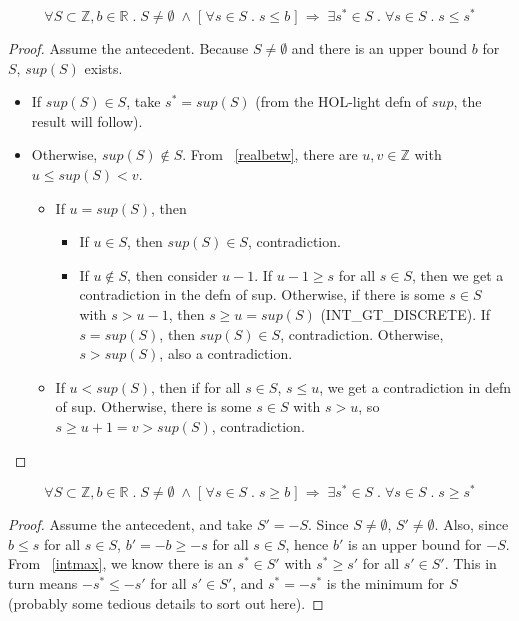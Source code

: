 \documentclass{article}
\begin{document}
\begin{lem}
\label{intmax}
\begin{equation*}
\forall S \subset \mathbb{Z}, b \in \mathbb{R} \; . \;
 S \neq \emptyset \; \wedge \; \big [ \; \forall s \in S \; . \; s \leq b \;
\big ] \; \Longrightarrow \; \exists s^* \in S \; . \; \forall s \in S \; . \;
s \leq s^*
\end{equation*}
\begin{proof} Assume the antecedent. Because $S \neq \emptyset$ and
there is an upper bound $b$ for $S$, $sup(S)$ exists.
\begin{itemize}
\item If $sup(S) \in S$, take $s^* = sup(S)$ (from the HOL-light defn of 
$sup$, the result will follow).
\item Otherwise, $sup(S) \notin S$. From ~\ref{realbetw}, there are
$u, v \in \mathbb{Z}$ with $u \leq sup(S) < v$.
\begin{itemize}
\item If $u = sup(S)$, then
\begin{itemize}
\item If $u \in S$, then $sup(S) \in S$, contradiction.
\item If $u \notin S$, then consider $u - 1$. If $u - 1 \geq s$ for all
$s \in S$, then we get a contradiction in the defn of sup. Otherwise, if
there is some $s \in S$ with $s > u - 1$, then $s \geq u = sup(S)$
(INT\_GT\_DISCRETE). If $s = sup(S)$, then $sup(S) \in S$, contradiction.
Otherwise, $s > sup(S)$, also a contradiction.
\end{itemize}
\item If $u < sup(S)$, then if for all $s \in S$, $s \leq u$, we get a 
contradiction in defn of sup. Otherwise, there is some $s \in S$ with
$s > u$, so $s \geq u + 1 = v > sup(S)$, contradiction.
\end{itemize}
\end{itemize}
\end{proof}
\end{lem}

\begin{lem}
\label{intmin}
\begin{equation*}
\forall S \subset \mathbb{Z}, b \in \mathbb{R} \; . \;
 S \neq \emptyset \; \wedge \; \big [ \; \forall s \in S \; . \; s \geq b \;
\big ] \; \Longrightarrow \; \exists s^* \in S \; . \; \forall s \in S \; . \;
s \geq s^*
\end{equation*}
\begin{proof} Assume the antecedent, and take $S' = -S$. Since $S \neq 
\emptyset$, $S' \neq \emptyset$. Also, since $b \leq s$ for all $s \in S$,
$b' = -b \geq -s$ for all $s \in S$, hence $b'$ is an upper bound for
$-S$. From ~\ref{intmax}, we know there is an $s^* \in S'$ with
$s^* \geq s'$ for all $s' \in S'$. This in turn means $-s^* \leq -s'$ for all
$s' \in S'$, and $s^* = -s^*$ is the minimum for $S$ (probably some tedious
details to sort out here).
\end{proof}
\end{lem}
\end{document}
